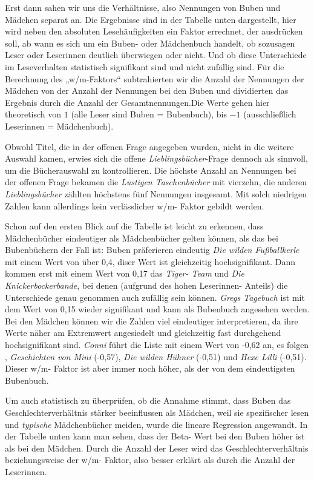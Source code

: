 Erst dann sahen wir uns die Verhältnisse, also Nennungen von Buben und
Mädchen separat an. Die Ergebnisse sind in der Tabelle unten
dargestellt, hier wird neben den absoluten Lesehäufigkeiten ein Faktor
errechnet, der ausdrücken soll, ab wann es sich um ein Buben- oder
Mädchenbuch handelt, ob sozusagen Leser oder Leserinnen deutlich
überwiegen oder nicht. Und ob diese Unterschiede im Leseverhalten
statistisch signifikant sind und nicht zufällig sind. Für die Berechnung
des „w/m-Faktors`` subtrahierten wir die Anzahl der Nennungen der
Mädchen von der Anzahl der Nennungen bei den Buben und dividierten das
Ergebnis durch die Anzahl der Gesamtnennungen.Die Werte gehen hier
theoretisch von $1$ (alle Leser sind Buben = Bubenbuch), bis $-1$
(ausschließlich Leserinnen = Mädchenbuch).



Obwohl Titel, die in der offenen Frage angegeben wurden, nicht in die
weitere Auswahl kamen, erwies sich die offene
\emph{Lieblingsbücher}-Frage dennoch als sinnvoll, um die Bücherauswahl
zu kontrollieren. Die höchste Anzahl an Nennungen bei der offenen Frage
bekamen die \emph{Lustigen Taschenbücher} mit vierzehn, die anderen
\emph{Lieblingsbücher} zählten höchstens fünf Nennungen insgesamt. Mit
solch niedrigen Zahlen kann allerdings kein verlässlicher w/m- Faktor
gebildt werden.

Schon auf den ersten Blick auf die Tabelle ist leicht zu erkennen, dass
Mädchenbücher eindeutiger als Mädchenbücher gelten können, als das bei
Bubenbüchern der Fall ist: Buben präferieren eindeutig \emph{Die wilden
Fußballkerle} mit einem Wert von über 0,4, diser Wert ist gleichzeitig
hochsignifikant. Dann kommen erst mit einem Wert von 0,17 das
\emph{Tiger- Team} und \emph{Die Knickerbockerbande}, bei denen
(aufgrund des hohen Leserinnen- Anteils) die Unterschiede genau genommen
auch zufällig sein können. \emph{Gregs Tagebuch} ist mit dem Wert von
0,15 wieder signifikant und kann als Bubenbuch angesehen werden. Bei den
Mädchen können wir die Zahlen viel eindeutiger interpretieren, da ihre
Werte näher am Extremwert angesiedelt und gleichzeitig fast durchgehend
hochsignifikant sind. \emph{Conni} führt die Liste mit einem Wert von
-0,62 an, es folgen , \emph{Geschichten von Mini} (-0,57), \emph{Die
wilden Hühner} (-0,51) und \emph{Hexe Lilli} (-0,51). Dieser w/m- Faktor
ist aber immer noch höher, als der von dem eindeutigsten Bubenbuch.

Um auch statistisch zu überprüfen, ob die Annahme stimmt, dass Buben das
Geschlechterverhältnis stärker beeinflussen als Mädchen, weil sie
spezifischer lesen und \emph{typische} Mädchenbücher meiden, wurde die
lineare Regression angewandt. In der Tabelle unten kann man sehen, dass
der Beta- Wert bei den Buben höher ist als bei den Mädchen. Durch die
Anzahl der Leser wird das Geschlechterverhältnis beziehungsweise der
w/m- Faktor, also besser erklärt als durch die Anzahl der Leserinnen.

